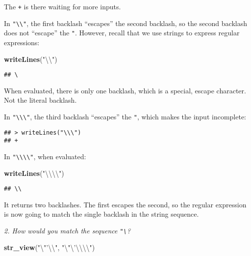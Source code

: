 \documentclass[]{article}
\newenvironment{Shaded}{\begin{snugshade}}{\end{snugshade}}
\newcommand{\KeywordTok}[1]{\textcolor[rgb]{0.13,0.29,0.53}{\textbf{#1}}}
\newcommand{\CharTok}[1]{\textcolor[rgb]{0.31,0.60,0.02}{#1}}
\newcommand{\StringTok}[1]{\textcolor[rgb]{0.31,0.60,0.02}{#1}}
\newcommand{\NormalTok}[1]{#1}
\theoremstyle{definition}
\theoremstyle{definition}
\theoremstyle{definition}
\theoremstyle{remark}
\begin{document}
The \texttt{+} is there waiting for more inputs.

In \texttt{"\textbackslash{}\textbackslash{}"}, the first backlash
``escapes'' the second backlash, so the second backlash does not
``escape'' the \texttt{"}. However, recall that we use strings to
express regular expressions:

\begin{Shaded}
\begin{Highlighting}[]
\KeywordTok{writeLines}\NormalTok{(}\StringTok{"}\CharTok{\textbackslash{}\textbackslash{}}\StringTok{"}\NormalTok{)}
\end{Highlighting}
\end{Shaded}

\begin{verbatim}
## \
\end{verbatim}

When evaluated, there is only one backlash, which is a special, escape
character. Not the literal backlash.

In \texttt{"\textbackslash{}\textbackslash{}\textbackslash{}"}, the
third backlash ``escapes'' the \texttt{"}, which makes the input
incomplete:

\begin{verbatim}
## > writeLines("\\\")
## +
\end{verbatim}

In
\texttt{"\textbackslash{}\textbackslash{}\textbackslash{}\textbackslash{}"},
when evaluated:

\begin{Shaded}
\begin{Highlighting}[]
\KeywordTok{writeLines}\NormalTok{(}\StringTok{"}\CharTok{\textbackslash{}\textbackslash{}\textbackslash{}\textbackslash{}}\StringTok{"}\NormalTok{)}
\end{Highlighting}
\end{Shaded}

\begin{verbatim}
## \\
\end{verbatim}

It returns two backlashes. The first escapes the second, so the regular
expression is now going to match the single backlash in the string
sequence.

\emph{2. How would you match the sequence
\texttt{"\textquotesingle{}\textbackslash{}}?}

\begin{Shaded}
\begin{Highlighting}[]
\KeywordTok{str_view}\NormalTok{(}\StringTok{"}\CharTok{\textbackslash{}"}\StringTok{'}\CharTok{\textbackslash{}\textbackslash{}}\StringTok{"}\NormalTok{, }\StringTok{"}\CharTok{\textbackslash{}"\textbackslash{}'\textbackslash{}\textbackslash{}\textbackslash{}\textbackslash{}}\StringTok{"}\NormalTok{)}
\end{Highlighting}
\end{Shaded}
\end{document}
